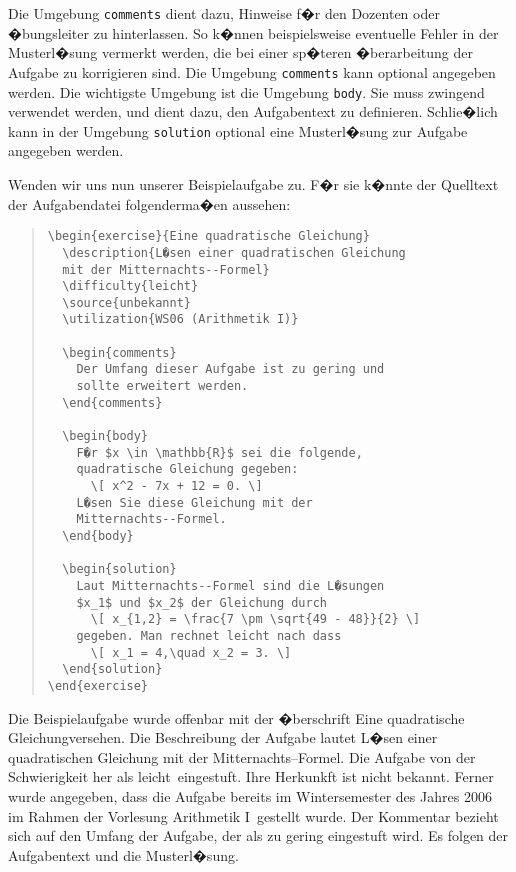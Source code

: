 Die Umgebung \verb|comments| dient dazu, Hinweise f�r den Dozenten oder �bungsleiter zu hinterlassen. So k�nnen beispielsweise eventuelle Fehler in der Musterl�sung vermerkt werden, die bei einer sp�teren �berarbeitung der Aufgabe zu korrigieren sind. Die Umgebung \verb|comments| kann optional angegeben werden. Die wichtigste Umgebung ist die Umgebung \verb|body|. Sie muss zwingend verwendet werden, und dient dazu, den Aufgabentext zu definieren. Schlie�lich kann in der Umgebung \verb|solution| optional eine Musterl�sung zur Aufgabe angegeben werden. 

Wenden wir uns nun unserer Beispielaufgabe zu. F�r sie k�nnte der Quelltext der Aufgabendatei folgenderma�en aussehen:

\begin{quote}
\begin{verbatim}
\begin{exercise}{Eine quadratische Gleichung}
  \description{L�sen einer quadratischen Gleichung      
  mit der Mitternachts--Formel}
  \difficulty{leicht}
  \source{unbekannt}
  \utilization{WS06 (Arithmetik I)}

  \begin{comments}
    Der Umfang dieser Aufgabe ist zu gering und 
    sollte erweitert werden.
  \end{comments}

  \begin{body}
    F�r $x \in \mathbb{R}$ sei die folgende, 
    quadratische Gleichung gegeben:
      \[ x^2 - 7x + 12 = 0. \]
    L�sen Sie diese Gleichung mit der
    Mitternachts--Formel. 
  \end{body}

  \begin{solution}
    Laut Mitternachts--Formel sind die L�sungen 
    $x_1$ und $x_2$ der Gleichung durch
      \[ x_{1,2} = \frac{7 \pm \sqrt{49 - 48}}{2} \]
    gegeben. Man rechnet leicht nach dass
      \[ x_1 = 4,\quad x_2 = 3. \]
  \end{solution}
\end{exercise}
\end{verbatim}
\end{quote}

\noindent
Die Beispielaufgabe wurde offenbar mit der �berschrift \glqq Eine quadratische Gleichung\grqq versehen. Die Beschreibung der Aufgabe lautet \glqq L�sen einer quadratischen Gleichung mit der Mitternachts--Formel\grqq. Die Aufgabe von der Schwierigkeit her als \glqq leicht\grqq\ eingestuft. Ihre Herkunkft ist nicht bekannt. Ferner wurde angegeben, dass die Aufgabe bereits im Wintersemester des Jahres 2006 im Rahmen der Vorlesung \glqq Arithmetik I\grqq\ gestellt wurde. Der Kommentar bezieht sich auf den Umfang der Aufgabe, der als zu gering eingestuft wird. Es folgen der Aufgabentext und die Musterl�sung.
 



